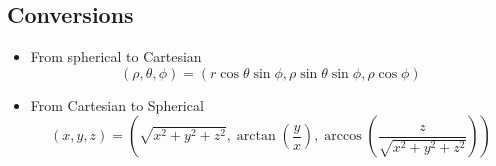 \subsection{Conversions}
\begin{itemize}
	\item From spherical to Cartesian
	\begin{equation*}
		(\rho, \theta, \phi) = (r\cos{\theta}\sin{\phi}, \rho\sin{\theta}\sin{\phi}, \rho\cos{\phi})
	\end{equation*}
	\item From Cartesian to Spherical
	\begin{equation*}
		(x, y, z)=\left(\sqrt{x^2 + y^2 + z^2}, \arctan{\left(\frac{y}{x}\right)}, \arccos{\left(\frac{z}{\sqrt{x^2 + y^2 + z^2}}\right)}\right)
	\end{equation*}
\end{itemize}